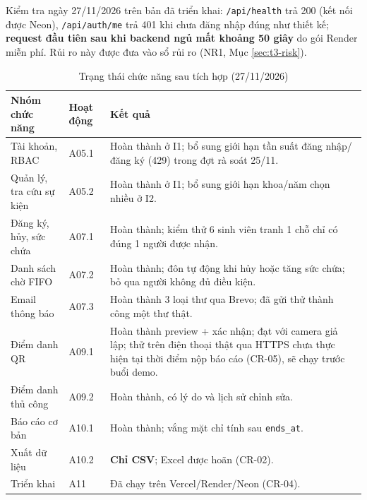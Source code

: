 Kiểm tra ngày 27/11/2026 trên bản đã triển khai: \texttt{/api/health} trả 200 (kết nối được Neon), \texttt{/api/auth/me} trả 401 khi chưa đăng nhập đúng như thiết kế; \textbf{request đầu tiên sau khi backend ngủ mất khoảng 50 giây} do gói Render miễn phí. Rủi ro này được đưa vào sổ rủi ro (NR1, Mục \ref{sec:t3-risk}).

\begin{table}[H]
\centering\small
\caption{Trạng thái chức năng sau tích hợp (27/11/2026)}\label{tab:t3-scope}
\begin{tabularx}{\linewidth}{@{}p{.20\linewidth}p{.13\linewidth}X@{}}
\toprule
\textbf{Nhóm chức năng} & \textbf{Hoạt động} & \textbf{Kết quả}\\\midrule
Tài khoản, RBAC & A05.1 & Hoàn thành ở I1; bổ sung giới hạn tần suất đăng nhập/đăng ký (429) trong đợt rà soát 25/11.\\
Quản lý, tra cứu sự kiện & A05.2 & Hoàn thành ở I1; bổ sung giới hạn khoa/năm chọn nhiều ở I2.\\
Đăng ký, hủy, sức chứa & A07.1 & Hoàn thành; kiểm thử 6 sinh viên tranh 1 chỗ chỉ có đúng 1 người được nhận.\\
Danh sách chờ FIFO & A07.2 & Hoàn thành; đôn tự động khi hủy hoặc tăng sức chứa; bỏ qua người không đủ điều kiện.\\
Email thông báo & A07.3 & Hoàn thành 3 loại thư qua Brevo; đã gửi thử thành công một thư thật.\\
Điểm danh QR & A09.1 & Hoàn thành preview + xác nhận; đạt với camera giả lập; thử trên điện thoại thật qua HTTPS chưa thực hiện tại thời điểm nộp báo cáo (CR-05), sẽ chạy trước buổi demo.\\
Điểm danh thủ công & A09.2 & Hoàn thành, có lý do và lịch sử chỉnh sửa.\\
Báo cáo cơ bản & A10.1 & Hoàn thành; vắng mặt chỉ tính sau \texttt{ends\_at}.\\
Xuất dữ liệu & A10.2 & \textbf{Chỉ CSV}; Excel được hoãn (CR-02).\\
Triển khai & A11 & Đã chạy trên Vercel/Render/Neon (CR-04).\\
\bottomrule
\end{tabularx}
\end{table}
